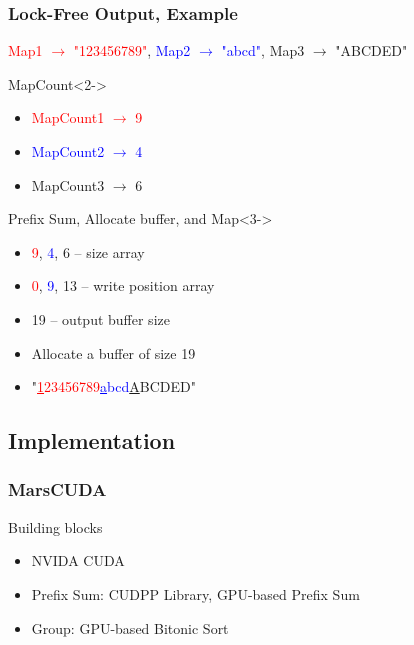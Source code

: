 \begin{frame}
\frametitle{Lock-Free Output, Example}
\textcolor{red}{Map1 $\rightarrow$ "123456789"}, \textcolor{blue}{Map2 $\rightarrow$ "abcd"}, Map3 $\rightarrow$ "ABCDED" 
\begin{block}{MapCount}<2->
\begin{itemize}
\item \textcolor{red}{MapCount1 $\rightarrow$ 9}
\item \textcolor{blue}{MapCount2 $\rightarrow$ 4}
\item MapCount3 $\rightarrow$ 6
\end{itemize}
\end{block}
\begin{block}{Prefix Sum, Allocate buffer, and Map}<3->
\begin{itemize}
\item<3-> \textcolor{red}{9}, \textcolor{blue}{4},  6 -- size array
\item<4-> \textcolor{red}{0}, \textcolor{blue}{9}, 13 -- write position array
\item<4-> 19 -- output buffer size
\item<5-> Allocate a buffer of size 19
\item<6-> "\textcolor{red}{\underline{1}23456789}\textcolor{blue}{\underline{a}bcd}\underline{A}BCDED"
\end{itemize}
\end{block}
\end{frame}

\subsection{Implementation}
\begin{frame}
\frametitle{MarsCUDA}
\begin{block}{Building blocks}
\begin{itemize}
\item NVIDA CUDA
\item Prefix Sum: CUDPP Library, GPU-based Prefix Sum
\item Group: GPU-based Bitonic Sort
\end{itemize}
\end{block}
\end{frame}

